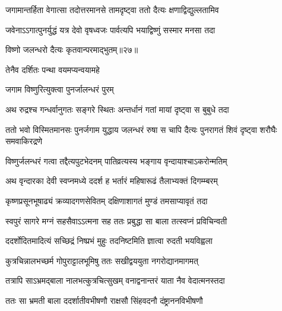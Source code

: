 \twolineshloka
{जगामान्तर्हिता वेगात्सा तदोत्तरमानसे}
{तामदृष्ट्वा ततो दैत्यः क्षणाद्विद्युल्लतामिव} %

\twolineshloka
{जवेनाऽऽगात्पुनर्युद्धं यत्र देवो वृषध्वजः}
{पार्वत्यपि भयाद्विष्णुं सस्मार मनसा तदा} %




विष्णो जलन्धरो दैत्यः कृतवान्परमाद्भुतम्॥२७॥



\onelineshloka
{तेनैव दर्शितः पन्था वयमप्यन्वयामहे} %




\onelineshloka
{जगाम विष्णुरित्युक्त्वा पुनर्जालन्धरं पुरम्} %

\twolineshloka
{अथ रुद्रश्च गन्धर्वानुगतः सङ्गरे स्थितः}
{अन्तर्धानं गतां मायां दृष्ट्वा स बुबुधे तदा} %

\twolineshloka
{ततो भवो विस्मितमानसः पुनर्जगाम युद्धाय जलन्धरं रुषा}
{स चापि दैत्यः पुनरागतं शिवं दृष्ट्वा शरौघैः समवाकिरद्रणे} %





\twolineshloka
{विष्णुर्जलन्धरं गत्वा तद्दैत्यपुटभेदनम्}
{पातिव्रत्यस्य भङ्गाय वृन्दायाश्चाऽकरोन्मतिम्} %

\twolineshloka
{अथ वृन्दारका देवी स्वप्नमध्ये ददर्श ह}
{भर्तारं महिषारूढं तैलाभ्यक्तं दिगम्म्बरम्} %

\twolineshloka
{कृष्णप्रसूनभूषाढ्यं क्रव्यादगणसेवितम्}
{दक्षिणाशागतं मुण्डं तमसाप्यावृतं तदा} %

\twolineshloka
{स्वपुरं सागरे मग्नं सहसैवाऽऽत्मना सह}
{ततः प्रबुद्धा सा बाला तत्स्वप्नं प्रविचिन्वती} %

\twolineshloka
{ददर्शोदितमादित्यं सच्छिद्रं निष्प्रभं मुहुः}
{तदनिष्टमिति ज्ञात्वा रुदती भयविह्वला} %

\twolineshloka
{कुत्रचिन्नालभच्छर्म गोपुराट्टालभूमिषु}
{ततः सखीद्वययुता नगरोद्यानमागमत्} %

\twolineshloka
{तत्रापि साऽभ्रमद्बाला नालभत्कुत्रचित्सुखम्}
{वनाद्वनान्तरं याता नैव वेदात्मनस्तदा} %

\twolineshloka
{ततः सा भ्रमती बाला ददर्शातीवभीषणौ}
{राक्षसौ सिंहवदनौ दंष्ट्राननविभीषणौ} %

